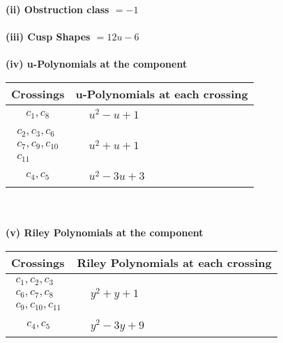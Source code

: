 \documentclass[1p]{elsarticle_modified}
\theoremstyle{definition}
\begin{document}
\flushleft \textbf{(ii) Obstruction class $= -1$}\\~\\
\flushleft \textbf{(iii) Cusp Shapes $= 12 u-6$}\\~\\
\newpage\renewcommand{\arraystretch}{1}
\flushleft \textbf{(iv) u-Polynomials at the component}\newline \\
\begin{tabular}{m{50pt}|m{274pt}}
Crossings & \hspace{64pt}u-Polynomials at each crossing \\
\hline $$\begin{aligned}c_{1},c_{8}\end{aligned}$$&$\begin{aligned}
&u^2- u+1
\end{aligned}$\\
\hline $$\begin{aligned}c_{2},c_{3},c_{6}\\c_{7},c_{9},c_{10}\\c_{11}\end{aligned}$$&$\begin{aligned}
&u^2+u+1
\end{aligned}$\\
\hline $$\begin{aligned}c_{4},c_{5}\end{aligned}$$&$\begin{aligned}
&u^2-3 u+3
\end{aligned}$\\
\hline
\end{tabular}\\~\\
\newpage\renewcommand{\arraystretch}{1}
\flushleft \textbf{(v) Riley Polynomials at the component}\newline \\
\begin{tabular}{m{50pt}|m{274pt}}
Crossings & \hspace{64pt}Riley Polynomials at each crossing \\
\hline $$\begin{aligned}c_{1},c_{2},c_{3}\\c_{6},c_{7},c_{8}\\c_{9},c_{10},c_{11}\end{aligned}$$&$\begin{aligned}
&y^2+y+1
\end{aligned}$\\
\hline $$\begin{aligned}c_{4},c_{5}\end{aligned}$$&$\begin{aligned}
&y^2-3 y+9
\end{aligned}$\\
\hline
\end{tabular}\\~\\
\end{document}
